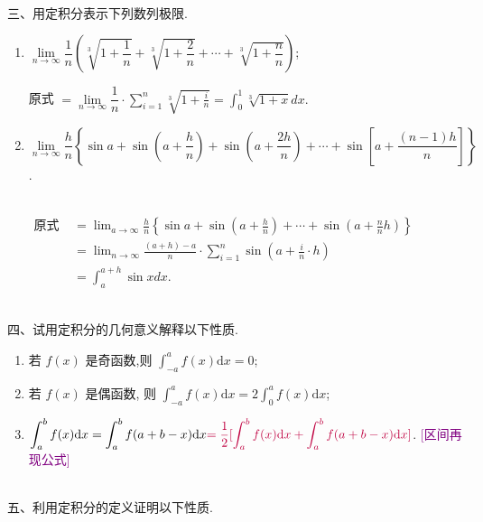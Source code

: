 \documentclass[lang=cn,newtx,10pt,scheme=chinese]{elegantbook}
\begin{document}
~\\
三、用定积分表示下列数列极限.\\
\begin{enumerate}
	\item $\lim\limits _{n \rightarrow \infty} \dfrac{1}{n}\left(\sqrt[3]{1+\dfrac{1}{n}}+\sqrt[3]{1+\dfrac{2}{n}}+\cdots+\sqrt[3]{1+\dfrac{n}{n}}\right)$;
\begin{solution}
	原式 $=\lim\limits _{n \rightarrow \infty} \dfrac{1}{n} \cdot \displaystyle\sum_{i=1}^n \sqrt[3]{1+\frac{i}{n}}=\int_0^1 \sqrt[3]{1+x} d x.
	$
\end{solution}
	\item $\lim\limits _{n \rightarrow \infty} \dfrac{h}{n}\left\{\sin a+\sin \left(a+\dfrac{h}{n}\right)+\sin \left(a+\dfrac{2 h}{n}\right)+\cdots+\sin \left[a+\dfrac{(n-1) h}{n}\right]\right\}$.
	\begin{solution}\\
		$
		\begin{aligned}
			\text{原式 }& =\lim _{a \rightarrow \infty} \frac{h}{n}\left\{\sin a+\sin \left(a+\frac{h}{n}\right)+\cdots+\sin \left(a+\frac{n}{n} h\right)\right\} \\
			& =\lim _{n \rightarrow \infty} \frac{(a+h)-a}{n} \cdot \sum_{i=1}^n \sin \left(a+\frac{i}{n} \cdot h\right) \\
			& =\int_a^{a+h} \sin x d x.
		\end{aligned}
		$
	\end{solution}
\end{enumerate}

~\\
四、试用定积分的几何意义解释以下性质.\\
\begin{enumerate}
	\item 若 $f(x)$ 是奇函数,则 $\displaystyle\int_{-a}^a f(x) \mathrm{d} x=0$;
	\item 若 $f(x)$ 是偶函数, 则 $\displaystyle\int_{-a}^a f(x) \mathrm{d} x=2 \displaystyle\int_0^a f(x) \mathrm{d} x$;
	\item  $\displaystyle\int_a^b f(x) \mathrm{d} x=\int_a^b f(a+b-x) \mathrm{d} x{\color{purple} =\dfrac{1}{2}[\displaystyle\int_a^b f(x) \mathrm{d} x+\int_a^b f(a+b-x) \mathrm{d} x]}$. \quad\textcolor{purple}{[区间再现公式]}

\end{enumerate}
~\\



五、利用定积分的定义证明以下性质.\\
\end{document}
